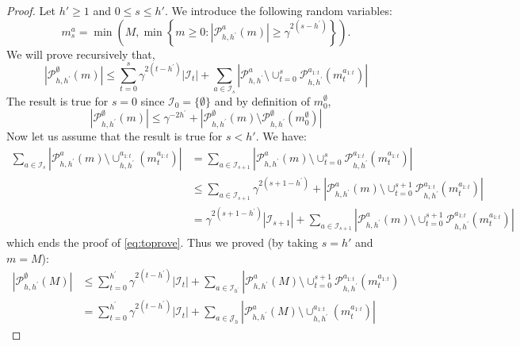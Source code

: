 \begin{subappendices}
\begin{proof}
	\noindent
	Let $h'\geq 1$ and $0 \leq s \leq h'$. We introduce the following random variables:
	\begin{equation*}
	m_{s}^{a}=\min \left(M, \min \left\{m \geq 0 :\left|\mathcal{P}_{h, h^{\prime}}^{a}(m)\right| \geq \gamma^{2\left(s-h^{\prime}\right)}\right\}\right).
	\end{equation*}
	We will prove recursively that,
	\begin{equation}
	\label{eq:toprove}
	\left|\mathcal{P}_{h, h^{\prime}}^{\emptyset}(m)\right| \leq \sum_{t=0}^{s} \gamma^{2\left(t-h^{\prime}\right)}\left|\mathcal{I}_{t}\right|+\sum_{a \in \mathcal{I}_{s}}\left|\mathcal{P}_{h, h^{\prime}}^{a} \setminus \cup_{t=0}^{s} \mathcal{P}_{h, h^{\prime}}^{a_{1:t}}\left(m_{t}^{a_{1:t}}\right)\right|
	\end{equation}
	The result is true for $s = 0$ since $\mathcal{I}_0 = \{\emptyset\}$ and by definition of $m^\emptyset_0$,
	\begin{equation*}
	\left|\mathcal{P}_{h, h^{\prime}}^{\emptyset}(m)\right| \leq \gamma^{-2 h^{\prime}}+\left|\mathcal{P}_{h, h^{\prime}}^{\emptyset}(m) \setminus \mathcal{P}_{h, h^{\prime}}^{\emptyset}\left(m_{0}^{\emptyset}\right)\right|
	\end{equation*}
	Now let us assume that the result is true for $s<h'$. We have:
	\begin{align*}
	\sum_{a \in \mathcal{I}_{s}}\left|\mathcal{P}_{h, h^{\prime}}^{a}(m) \setminus \cup_{h, h^{\prime}}^{a_{1 : t}}\left(m_{t}^{a_{1 : t}}\right)\right|&=\sum_{a \in \mathcal{I}_{s+1}}\left|\mathcal{P}_{h, h^{\prime}}^{a}(m) \setminus \cup_{t=0}^{s} \mathcal{P}_{h, h^{\prime}}^{a_{1 : t}}\left(m_{t}^{a_{1 : t}}\right)\right|\\
	&\leq \sum_{a \in \mathcal{I}_{s+1}} \gamma^{2\left(s+1-h^{\prime}\right)}+\left|\mathcal{P}_{h, h^{\prime}}^{a}(m) \setminus \cup_{t=0}^{s+1} \mathcal{P}_{h, h^{\prime}}^{a_{1 : t}}\left(m_{t}^{a_{1 : t}}\right)\right|\\
	&= \gamma^{2\left(s+1-h^{\prime}\right)}\left|\mathcal{I}_{s+1}\right|+\sum_{a \in \mathcal{I}_{s+1}}\left|\mathcal{P}_{h, h^{\prime}}^{a}(m) \setminus \cup_{t=0}^{s+1} \mathcal{P}_{h, h^{\prime}}^{a_{1 ; t}}\left(m_{t}^{a_{1 : t}}\right)\right|
	\end{align*}
	which ends the proof of \eqref{eq:toprove}. Thus we proved (by taking $s=h'$ and $m=M$):
	\begin{equation*}
	\begin{aligned}\left|\mathcal{P}_{h, h^{\prime}}^{\emptyset}(M)\right| & \leq \sum_{t=0}^{h^{\prime}} \gamma^{2\left(t-h^{\prime}\right)}\left|\mathcal{I}_{t}\right|+\sum_{a \in \mathcal{I}_{h^{\prime}}}\left|\mathcal{P}_{h, h^{\prime}}^{a}(M) \setminus \cup_{t=0}^{s+1} \mathcal{P}_{h, h^{\prime}}^{a_{1 : t}}\left(m_{t}^{a_{1 : t}}\right)\right.\\ &=\sum_{t=0}^{h^{\prime}} \gamma^{2\left(t-h^{\prime}\right)}\left|\mathcal{I}_{t}\right|+\sum_{a \in \mathcal{J}_{h}}\left|\mathcal{P}_{h, h^{\prime}}^{a}(M) \setminus \cup_{h, h^{\prime}}^{a_{1 : t}}\left(m_{t}^{a_{1 : t}}\right)\right| \end{aligned}
	\end{equation*}
	

\end{proof}
\end{subappendices}
